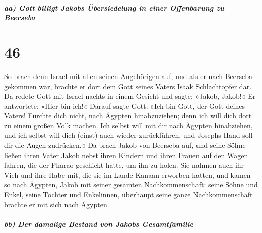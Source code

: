 \hypertarget{aa-gott-billigt-jakobs-uxfcbersiedelung-in-einer-offenbarung-zu-beerseba}{%
\subparagraph{aa) Gott billigt Jakobs Übersiedelung in einer Offenbarung
zu
Beerseba}\label{aa-gott-billigt-jakobs-uxfcbersiedelung-in-einer-offenbarung-zu-beerseba}}

\hypertarget{section-45}{%
\section{46}\label{section-45}}

 So brach denn Israel mit allen seinen Angehörigen auf,
und als er nach Beerseba gekommen war, brachte er dort dem Gott seines
Vaters Isaak Schlachtopfer dar.  Da redete Gott mit Israel
nachts in einem Gesicht und sagte: »Jakob, Jakob!« Er antwortete: »Hier
bin ich!«  Darauf sagte Gott: »Ich bin Gott, der Gott
deines Vaters! Fürchte dich nicht, nach Ägypten hinabzuziehen; denn ich
will dich dort zu einem großen Volk machen.  Ich selbst
will mit dir nach Ägypten hinabziehen, und ich selbst will dich (einst)
auch wieder zurückführen, und Josephs Hand soll dir die Augen
zudrücken.«  Da brach Jakob von Beerseba auf, und seine
Söhne ließen ihren Vater Jakob nebst ihren Kindern und ihren Frauen auf
den Wagen fahren, die der Pharao geschickt hatte, um ihn zu holen.
 Sie nahmen auch ihr Vieh und ihre Habe mit, die sie im
Lande Kanaan erworben hatten, und kamen so nach Ägypten, Jakob mit
seiner gesamten Nachkommenschaft:  seine Söhne und Enkel,
seine Töchter und Enkelinnen, überhaupt seine ganze Nachkommenschaft
brachte er mit sich nach Ägypten.

\hypertarget{bb-der-damalige-bestand-von-jakobs-gesamtfamilie}{%
\subparagraph{bb) Der damalige Bestand von Jakobs
Gesamtfamilie}\label{bb-der-damalige-bestand-von-jakobs-gesamtfamilie}}

